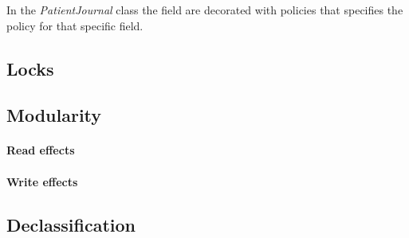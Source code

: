 


In the \emph{PatientJournal} class the field are decorated with policies that specifies the policy for that specific field. 


\subsection{Locks}


\subsection{Modularity}

\paragraph{Read effects}

\paragraph{Write effects}

\subsection{Declassification}

